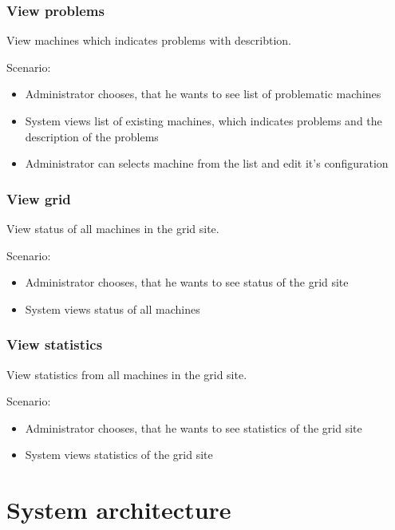\documentclass[12pt]{article}
\begin{document}
\subsubsection{View problems}
View machines which indicates problems with describtion.

Scenario:
\begin{itemize}
\item{Administrator chooses, that he wants to see list of problematic machines}
\item{System views list of existing machines, which indicates problems and the description of the problems}
\item{Administrator can selects machine from the list and edit it's configuration}
\end{itemize}

\subsubsection{View grid}
View status of all machines in the grid site.

Scenario:
\begin{itemize}
\item{Administrator chooses, that he wants to see status of the grid site}
\item{System views status of all machines}
\end{itemize}

\subsubsection{View statistics}
View statistics from all machines in the grid site.

Scenario:
\begin{itemize}
\item{Administrator chooses, that he wants to see statistics of the grid site}
\item{ System views statistics of the grid site}
\end{itemize}

\section{System architecture}
\end{document}

